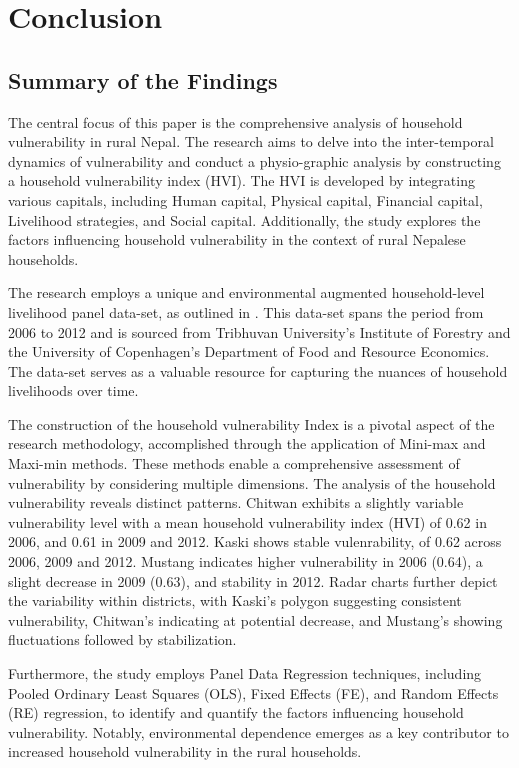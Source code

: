 \section{Conclusion} \label{isect5}
\subsection{Summary of the Findings}
The central focus of this paper is the comprehensive analysis of household vulnerability in rural Nepal. The research aims to delve into the inter-temporal dynamics of vulnerability and conduct a physio-graphic analysis by constructing a household vulnerability index (HVI). The HVI is developed by integrating various capitals, including Human capital, Physical capital, Financial capital, Livelihood strategies, and Social capital. Additionally, the study explores the factors influencing household vulnerability in the context of rural Nepalese households.

The research employs a unique and environmental augmented household-level livelihood panel data-set, as outlined in \citep{walelign2022unique}. This data-set spans the period from 2006 to 2012 and is sourced from Tribhuvan University’s Institute of Forestry and the University of Copenhagen’s Department of Food and Resource Economics. The data-set serves as a valuable resource for capturing the nuances of household livelihoods over time. 

The construction of the household vulnerability Index is a pivotal aspect of the research methodology, accomplished through the application of Mini-max and Maxi-min methods. These methods enable a comprehensive assessment of vulnerability by considering multiple dimensions. The analysis of the household vulnerability reveals distinct patterns. Chitwan exhibits a slightly variable vulnerability level with a mean household vulnerability index (HVI) of 0.62 in 2006, and 0.61 in 2009 and 2012. Kaski shows stable vulenrability, of 0.62 across 2006, 2009 and 2012. Mustang indicates higher vulnerability in 2006 (0.64), a slight decrease in 2009 (0.63), and stability in 2012.  Radar charts further depict the variability within districts, with Kaski's polygon suggesting consistent vulnerability, Chitwan's indicating at potential decrease, and Mustang's showing fluctuations followed by stabilization.  

Furthermore, the study employs Panel Data Regression techniques, including Pooled Ordinary Least Squares (OLS), Fixed Effects (FE), and Random Effects (RE) regression, to identify and quantify the factors influencing household vulnerability. Notably, environmental dependence emerges as a key contributor to increased household vulnerability in the rural households.

